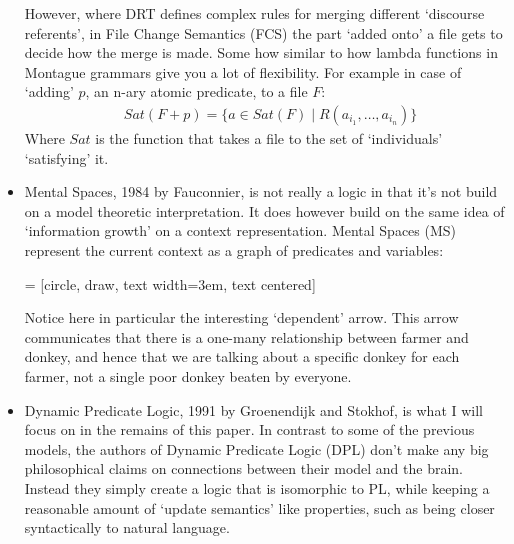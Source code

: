 \documentclass[12pt]{article}
\begin{document}
\begin{itemize}
However, where DRT defines complex rules for merging different `discourse referents', in File Change Semantics (FCS) the part `added onto' a file gets to decide how the merge is made. Some how similar to how lambda functions in Montague grammars give you a lot of flexibility. For example in case of `adding' $p$, an n-ary atomic predicate, to a file $F$:
%
\begin{align}
&Sat(F + p) = \{a \in Sat(F) \mid R(a_{i_1}, \dots, a_{i_n})\} \nonumber
\end{align}
%
Where $Sat$ is the function that takes a file to the set of `individuals' `satisfying' it.

\item Mental Spaces, 1984 by Fauconnier\cite{fauconnier1984espaces}, is not really a logic in that it's not build on a model theoretic interpretation. It does however build on the same idea of `information growth' on a context representation. Mental Spaces (MS) represent the current context as a graph of predicates and variables:

 = [circle, draw, text width=3em, text centered]

Notice here in particular the interesting `dependent' arrow. This arrow communicates that there is a one-many relationship between farmer and donkey, and hence that we are talking about a specific donkey for each farmer, not a single poor donkey beaten by everyone.

\item Dynamic Predicate Logic, 1991 by Groenendijk and Stokhof\cite{groenendijk1991dynamic}, is what I will focus on in the remains of this paper. In contrast to some of the previous models, the authors of Dynamic Predicate Logic (DPL) don't make any big philosophical claims on connections between their model and the brain. Instead they simply create a logic that is isomorphic to PL, while keeping a reasonable amount of `update semantics' like properties, such as being closer syntactically to natural language.


\end{itemize}
\end{document}
